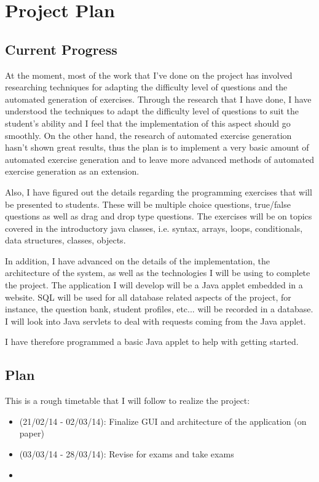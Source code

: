 \documentclass[11pt,a4paper]{report}
\begin{document}

\chapter{Project Plan}
\section{Current Progress}
At the moment, most of the work that I've done on the project has involved researching techniques for adapting the difficulty level of questions and the automated generation of exercises. Through the research that I have done, I have understood the techniques to adapt the difficulty level of questions to suit the student's ability and I feel that the implementation of this aspect should go smoothly. On the other hand, the research of automated exercise generation hasn't shown great results, thus the plan is to implement a very basic amount of automated exercise generation and to leave more advanced methods of automated exercise generation as an extension. \newline

Also, I have figured out the details regarding the programming exercises that will be presented to students. These will be multiple choice questions, true/false questions as well as drag and drop type questions. The exercises will be on topics covered in the introductory java classes, i.e. syntax, arrays, loops, conditionals, data structures, classes, objects.
\newline

In addition, I have advanced on the details of the implementation, the architecture of the system, as well as the technologies I will be using to complete the project. The application I will develop will be a Java applet embedded in a website. SQL will be used for all database related aspects of the project, for instance, the question bank, student profiles, etc... will be recorded in a database. I will look into Java servlets to deal with requests coming from the Java applet. \newline

I have therefore programmed a basic Java applet to help with getting started.

\section{Plan}
This is a rough timetable that I will follow to realize the project:
\begin{itemize}
\item (21/02/14 - 02/03/14): Finalize GUI and architecture of the application (on paper)
\item (03/03/14 - 28/03/14): Revise for exams and take exams
\item 
\end{itemize}
\end{document}
